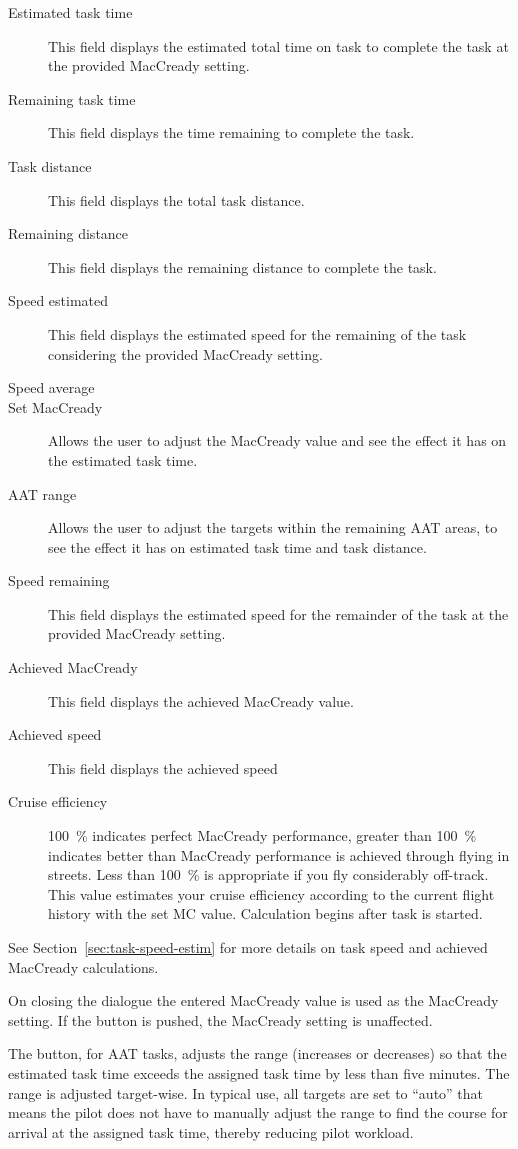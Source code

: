 \begin{description}
\item[Estimated task time]  This field displays the estimated total time 
  on task to complete the task at the provided MacCready setting.
\item[Remaining task time]  This field displays the time remaining to complete the task.
\item[Task distance]  This field displays the total task distance.
\item[Remaining distance]  This field displays the remaining distance to complete the task.
\item[Speed estimated]  This field displays the estimated speed  for the remaining of the task considering the provided MacCready setting.
\item[Speed average]  %
\item[Set MacCready]  Allows the user to adjust the MacCready value and 
  see the effect it has on the estimated task time.
\item[AAT range]  Allows the user to adjust the targets within the remaining 
  AAT areas, to see the effect it has on estimated task time and task distance.
\item[Speed remaining]  This field displays the estimated speed for the
  remainder of the task at the provided MacCready setting.
\item[Achieved MacCready]  This field displays the achieved MacCready value.
\item[Achieved speed]  This field displays the achieved speed %
\item[Cruise efficiency]  100~\% indicates perfect MacCready performance, greater 
than 100~\% indicates better than MacCready performance is achieved through flying
in streets. Less than 100~\% is appropriate if you fly considerably off-track. This 
value estimates your cruise efficiency according to the current flight history 
with the set MC value. Calculation begins after task is started.
\end{description}
See Section~\ref{sec:task-speed-estim} for more details on task speed
and achieved MacCready calculations.

On closing the dialogue the entered MacCready value is used as the MacCready 
setting. If the  button is pushed, the MacCready setting is 
unaffected.

The  button, for AAT tasks, adjusts the range
(increases or decreases) so that the estimated task time exceeds the
assigned task time by less than five minutes.  The range is adjusted
target-wise. In typical use, all targets are set to ``auto'' that means the pilot
does not have to manually adjust the range to find the course for arrival at 
the assigned task time, thereby reducing pilot workload.

